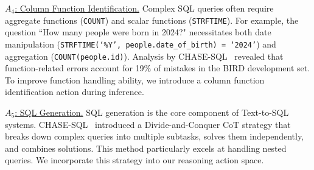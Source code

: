 \uline{$A_4$: Column Function Identification.}
Complex SQL queries often require aggregate functions (\eg \texttt{COUNT}) and scalar functions (\eg \texttt{STRFTIME}).
For example, the question ``How many people were born in 2024?" necessitates both date manipulation (\texttt{STRFTIME(`\%Y', people.date\_of\_birth) = `2024'}) and aggregation (\texttt{COUNT(people.id)}). 
Analysis by CHASE-SQL~\cite{CHASE} revealed that function-related errors account for 19\% of mistakes in the BIRD development set. 
To improve function handling ability, we introduce a column function identification action during inference.

\uline{$A_5$: SQL Generation.}
SQL generation is the core component of Text-to-SQL systems. CHASE-SQL~\cite{CHASE} introduced a Divide-and-Conquer CoT strategy that breaks down complex queries into multiple subtasks, solves them independently, and combines solutions. This method particularly excels at handling nested queries. 
We incorporate this strategy into our reasoning action space.


